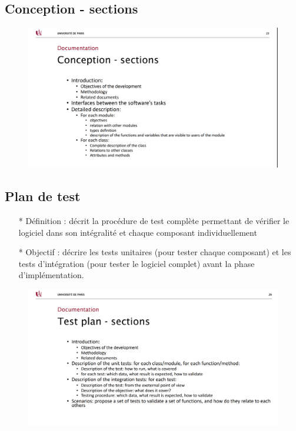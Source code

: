 \documentclass[12pt]{article}
\begin{document}
\subsection{Conception - sections}
\newpage
	\begin{figure}[!hbtp]
	\centering
	\includegraphics[scale=0.75]{Capture5.PNG}
\end{figure}
\subsection{Plan de test}
\begin{itemize}
	\item[* ] Définition : décrit la procédure de test complète permettant de vérifier le
	logiciel dans son intégralité et chaque composant individuellement
	\item[* ] Objectif : décrire les tests unitaires (pour tester chaque composant) et les tests d'intégration (pour tester le logiciel complet) avant la phase d'implémentation.
\end{itemize}
\newpage
	\begin{figure}[!hbtp]
	\centering
	\includegraphics[scale=0.75]{Capture6.PNG}
\end{figure}
\end{document}
